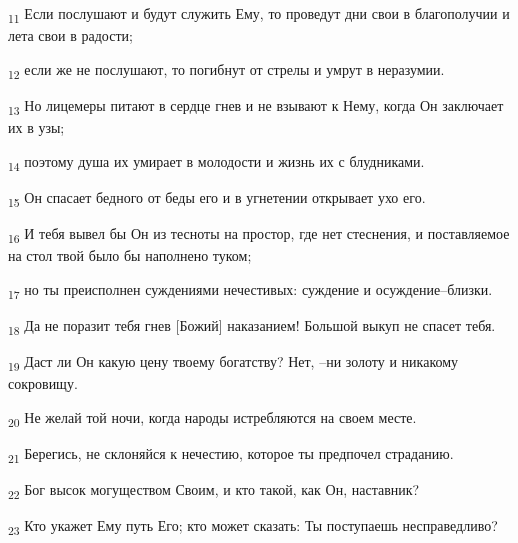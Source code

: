 \begin{tcolorbox}
\textsubscript{11} Если послушают и будут служить Ему, то проведут дни свои в благополучии и лета свои в радости;
\end{tcolorbox}
\begin{tcolorbox}
\textsubscript{12} если же не послушают, то погибнут от стрелы и умрут в неразумии.
\end{tcolorbox}
\begin{tcolorbox}
\textsubscript{13} Но лицемеры питают в сердце гнев и не взывают к Нему, когда Он заключает их в узы;
\end{tcolorbox}
\begin{tcolorbox}
\textsubscript{14} поэтому душа их умирает в молодости и жизнь их с блудниками.
\end{tcolorbox}
\begin{tcolorbox}
\textsubscript{15} Он спасает бедного от беды его и в угнетении открывает ухо его.
\end{tcolorbox}
\begin{tcolorbox}
\textsubscript{16} И тебя вывел бы Он из тесноты на простор, где нет стеснения, и поставляемое на стол твой было бы наполнено туком;
\end{tcolorbox}
\begin{tcolorbox}
\textsubscript{17} но ты преисполнен суждениями нечестивых: суждение и осуждение--близки.
\end{tcolorbox}
\begin{tcolorbox}
\textsubscript{18} Да не поразит тебя гнев [Божий] наказанием! Большой выкуп не спасет тебя.
\end{tcolorbox}
\begin{tcolorbox}
\textsubscript{19} Даст ли Он какую цену твоему богатству? Нет, --ни золоту и никакому сокровищу.
\end{tcolorbox}
\begin{tcolorbox}
\textsubscript{20} Не желай той ночи, когда народы истребляются на своем месте.
\end{tcolorbox}
\begin{tcolorbox}
\textsubscript{21} Берегись, не склоняйся к нечестию, которое ты предпочел страданию.
\end{tcolorbox}
\begin{tcolorbox}
\textsubscript{22} Бог высок могуществом Своим, и кто такой, как Он, наставник?
\end{tcolorbox}
\begin{tcolorbox}
\textsubscript{23} Кто укажет Ему путь Его; кто может сказать: Ты поступаешь несправедливо?
\end{tcolorbox}
